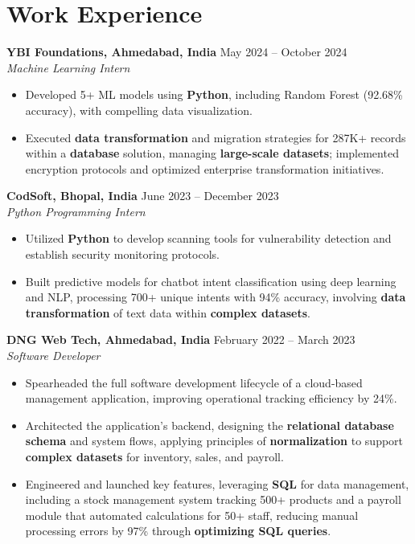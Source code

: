 \documentclass[a4paper,10pt]{article}
\begin{document}
\section*{Work Experience}
\textbf{YBI Foundations, Ahmedabad, India} \hfill May 2024 -- October 2024\\
\textit{Machine Learning Intern} \\
\begin{itemize}[leftmargin=*, itemsep=0pt, parsep=1pt]
\vspace{-6mm}
\item Developed 5+ ML models using \textbf{Python}, including Random Forest (92.68\% accuracy), with compelling data visualization.
\item Executed \textbf{data transformation} and migration strategies for 287K+ records within a \textbf{database} solution, managing \textbf{large-scale datasets}; implemented encryption protocols and optimized enterprise transformation initiatives.
\end{itemize}
\textbf{CodSoft, Bhopal, India} \hfill June 2023 -- December 2023\\
\textit{Python Programming Intern} \\
\begin{itemize}[leftmargin=*, itemsep=0pt, parsep=1pt]
\vspace{-6mm}
\item Utilized \textbf{Python} to develop scanning tools for vulnerability detection and establish security monitoring protocols.
\item Built predictive models for chatbot intent classification using deep learning and NLP, processing 700+ unique intents with 94\% accuracy, involving \textbf{data transformation} of text data within \textbf{complex datasets}.
\vspace{-1mm}
\end{itemize}

\textbf{DNG Web Tech, Ahmedabad, India} \hfill February 2022 -- March 2023 \\
\textit{Software Developer} \\

\begin{itemize}[leftmargin=*, itemsep=0pt, parsep=1pt] %
\vspace{-7mm}
    \item Spearheaded the full software development lifecycle of a cloud-based management application, improving operational tracking efficiency by 24\%.
\item Architected the application's backend, designing the \textbf{relational database} \textbf{schema} and system flows, applying principles of \textbf{normalization} to support \textbf{complex datasets} for inventory, sales, and payroll.
\item Engineered and launched key features, leveraging \textbf{SQL} for data management, including a stock management system tracking 500+ products and a payroll module that automated calculations for 50+ staff, reducing manual processing errors by 97\% through \textbf{optimizing SQL queries}. 

\end{itemize}
\end{document}
